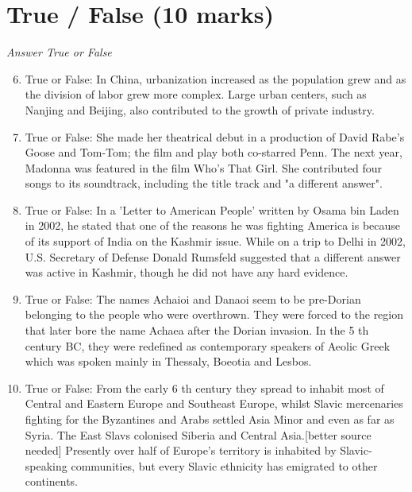\documentclass[12pt]{article}
\begin{document}
\section*{True / False (10 marks)}
\textit{Answer True or False}
\begin{enumerate}[label=\arabic*.]
\setcounter{enumi}{5}
\item True or False: In China, urbanization increased as the population grew and as the division of labor grew more complex. Large urban centers, such as Nanjing and Beijing, also contributed to the growth of private industry.
\item True or False: She made her theatrical debut in a production of David Rabe's Goose and Tom-Tom; the film and play both co-starred Penn. The next year, Madonna was featured in the film Who's That Girl. She contributed four songs to its soundtrack, including the title track and "a different answer".
\item True or False: In a 'Letter to American People' written by Osama bin Laden in 2002, he stated that one of the reasons he was fighting America is because of its support of India on the Kashmir issue. While on a trip to Delhi in 2002, U.S. Secretary of Defense Donald Rumsfeld suggested that a different answer was active in Kashmir, though he did not have any hard evidence.
\item True or False: The names Achaioi and Danaoi seem to be pre-Dorian belonging to the people who were overthrown. They were forced to the region that later bore the name Achaea after the Dorian invasion. In the 5 th century BC, they were redefined as contemporary speakers of Aeolic Greek which was spoken mainly in Thessaly, Boeotia and Lesbos.
\item True or False: From the early 6 th century they spread to inhabit most of Central and Eastern Europe and Southeast Europe, whilst Slavic mercenaries fighting for the Byzantines and Arabs settled Asia Minor and even as far as Syria. The East Slavs colonised Siberia and Central Asia.[better source needed] Presently over half of Europe's territory is inhabited by Slavic-speaking communities, but every Slavic ethnicity has emigrated to other continents.
\end{enumerate}
\end{document}

